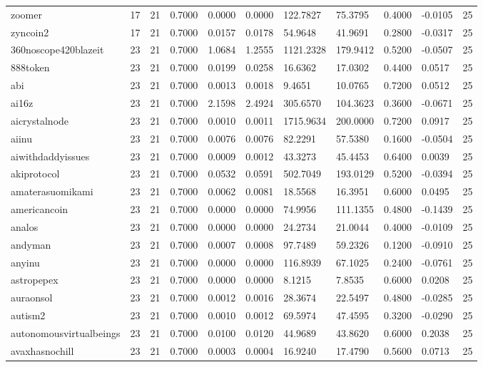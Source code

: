 \begin{table}[htbp]
\begin{tabular}{lllllllllll}
zoomer & 17 & 21 & 0.7000 & 0.0000 & 0.0000 & 122.7827 & 75.3795 & 0.4000 & -0.0105 & 25 \\
zyncoin2 & 17 & 21 & 0.7000 & 0.0157 & 0.0178 & 54.9648 & 41.9691 & 0.2800 & -0.0317 & 25 \\
360noscope420blazeit & 23 & 21 & 0.7000 & 1.0684 & 1.2555 & 1121.2328 & 179.9412 & 0.5200 & -0.0507 & 25 \\
888token & 23 & 21 & 0.7000 & 0.0199 & 0.0258 & 16.6362 & 17.0302 & 0.4400 & 0.0517 & 25 \\
abi & 23 & 21 & 0.7000 & 0.0013 & 0.0018 & 9.4651 & 10.0765 & 0.7200 & 0.0512 & 25 \\
ai16z & 23 & 21 & 0.7000 & 2.1598 & 2.4924 & 305.6570 & 104.3623 & 0.3600 & -0.0671 & 25 \\
aicrystalnode & 23 & 21 & 0.7000 & 0.0010 & 0.0011 & 1715.9634 & 200.0000 & 0.7200 & 0.0917 & 25 \\
aiinu & 23 & 21 & 0.7000 & 0.0076 & 0.0076 & 82.2291 & 57.5380 & 0.1600 & -0.0504 & 25 \\
aiwithdaddyissues & 23 & 21 & 0.7000 & 0.0009 & 0.0012 & 43.3273 & 45.4453 & 0.6400 & 0.0039 & 25 \\
akiprotocol & 23 & 21 & 0.7000 & 0.0532 & 0.0591 & 502.7049 & 193.0129 & 0.5200 & -0.0394 & 25 \\
amaterasuomikami & 23 & 21 & 0.7000 & 0.0062 & 0.0081 & 18.5568 & 16.3951 & 0.6000 & 0.0495 & 25 \\
americancoin & 23 & 21 & 0.7000 & 0.0000 & 0.0000 & 74.9956 & 111.1355 & 0.4800 & -0.1439 & 25 \\
analos & 23 & 21 & 0.7000 & 0.0000 & 0.0000 & 24.2734 & 21.0044 & 0.4000 & -0.0109 & 25 \\
andyman & 23 & 21 & 0.7000 & 0.0007 & 0.0008 & 97.7489 & 59.2326 & 0.1200 & -0.0910 & 25 \\
anyinu & 23 & 21 & 0.7000 & 0.0000 & 0.0000 & 116.8939 & 67.1025 & 0.2400 & -0.0761 & 25 \\
astropepex & 23 & 21 & 0.7000 & 0.0000 & 0.0000 & 8.1215 & 7.8535 & 0.6000 & 0.0208 & 25 \\
auraonsol & 23 & 21 & 0.7000 & 0.0012 & 0.0016 & 28.3674 & 22.5497 & 0.4800 & -0.0285 & 25 \\
autism2 & 23 & 21 & 0.7000 & 0.0010 & 0.0012 & 69.5974 & 47.4595 & 0.3200 & -0.0290 & 25 \\
autonomousvirtualbeings & 23 & 21 & 0.7000 & 0.0100 & 0.0120 & 44.9689 & 43.8620 & 0.6000 & 0.2038 & 25 \\
avaxhasnochill & 23 & 21 & 0.7000 & 0.0003 & 0.0004 & 16.9240 & 17.4790 & 0.5600 & 0.0713 & 25 \\

\end{tabular}
\end{table}
